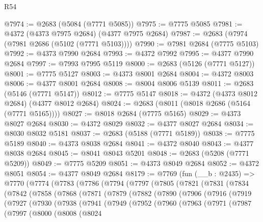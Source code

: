 \begin{lexlean}{R54}
\begin{coremodule}
@7974 := @2683 (@5084 (@7771 @5085))
@7975 := @7775 @5085
@7981 := @4372 (@4373 @7975 @2684) (@4377 @7975 @2684)
@7987 := @2683 (@7974 (@7981 @2686 (@5102 (@7771 @5103))))
@7990 := @7981 @2684 (@7775 @5103)
@7992 := @4373 @7990 @2684
@7993 := @4372 @7992
@7995 := @4377 @7990 @2684
@7997 := @7993 @7995 @5119
@8000 := @2683 (@5126 (@7771 @5127))
@8001 := @7775 @5127
@8003 := @4373 @8001 @2684
@8004 := @4372 @8003
@8006 := @4377 @8001 @2684
@8008 := @8004 @8006 @5139
@8011 := @2683 (@5146 (@7771 @5147))
@8012 := @7775 @5147
@8018 := @4372 (@4373 @8012 @2684) (@4377 @8012 @2684)
@8024 := @2683 (@8011 (@8018 @2686 (@5164 (@7771 @5165))))
@8027 := @8018 @2684 (@7775 @5165)
@8029 := @4373 @8027 @2684
@8030 := @4372 @8029
@8032 := @4377 @8027 @2684
@8034 := @8030 @8032 @5181
@8037 := @2683 (@5188 (@7771 @5189))
@8038 := @7775 @5189
@8040 := @4373 @8038 @2684
@8041 := @4372 @8040
@8043 := @4377 @8038 @2684
@8045 := @8041 @8043 @5201
@8048 := @2683 (@5208 (@7771 @5209))
@8049 := @7775 @5209
@8051 := @4373 @8049 @2684
@8052 := @4372 @8051
@8054 := @4377 @8049 @2684
@8179 := @7769
    (fun (__b : @2435) =>
    @7770
      (@7774
        (@7783
          (@7786
            (@7794
              (@7797
                (@7805
                  (@7821
                    (@7831
                      (@7834
                        (@7842
                          (@7858
                            (@7868
                              (@7871
                                (@7879
                                  (@7882
                                    (@7890
                                      (@7906
                                        (@7916
                                          (@7919
                                            (@7927
                                              (@7930
                                                (@7938
                                                  (@7941
                                                    (@7949
                                                      (@7952
                                                        (@7960
                                                          (@7963
                                                            (@7971
                                                              (@7987
                                                                (@7997
                                                                  (@8000
                                                                    (@8008
                                                                      (@8024

\end{coremodule}
\end{lexlean}
